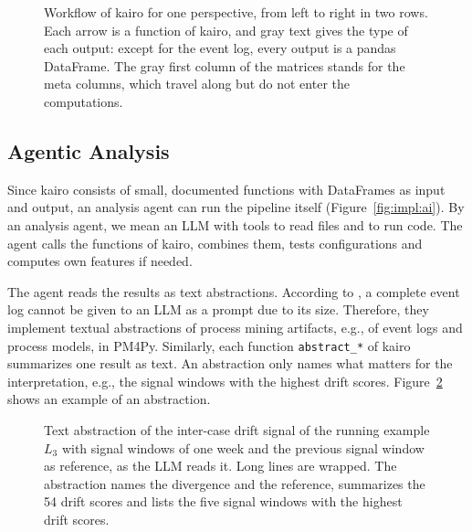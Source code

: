 \begin{figure}[tb]
	\centering
	\resizebox{\textwidth}{!}{}
	\caption[Workflow of kairo]{%
		Workflow of kairo for one perspective, from left to right in two rows. Each arrow is a function of kairo, and gray text gives the type of each output: except for the event log, every output is a pandas DataFrame. The gray first column of the matrices stands for the meta columns, which travel along but do not enter the computations.}
	\label{fig:impl:workflow}
\end{figure}

\subsection{Agentic Analysis}
\label{sec:impl:kairo:agent}
Since kairo consists of small, documented functions with DataFrames as input and output, an analysis agent can run the pipeline itself (Figure~\ref{fig:impl:ai}). By an analysis agent, we mean an LLM with tools to read files and to run code. The agent calls the functions of kairo, combines them, tests configurations and computes own features if needed.

The agent reads the results as text abstractions. According to \textcite{berti2024abstractions}, a complete event log cannot be given to an LLM as a prompt due to its size. Therefore, they implement textual abstractions of process mining artifacts, e.g., of event logs and process models, in PM4Py. Similarly, each function \texttt{abstract\_*} of kairo summarizes one result as text. An abstraction only names what matters for the interpretation, e.g., the signal windows with the highest drift scores. Figure~\ref{fig:impl:abstraction} shows an example of an abstraction.

\begin{figure}[tb]
	\centering
	\begin{minipage}{0.95\textwidth}
		\footnotesize
		
	\end{minipage}
	\caption[Text abstraction of a drift signal]{%
		Text abstraction of the inter-case drift signal of the running example $L_3$ with signal windows of one week and the previous signal window as reference, as the LLM reads it. Long lines are wrapped. The abstraction names the divergence and the reference, summarizes the 54 drift scores and lists the five signal windows with the highest drift scores.}
	\label{fig:impl:abstraction}
\end{figure}

